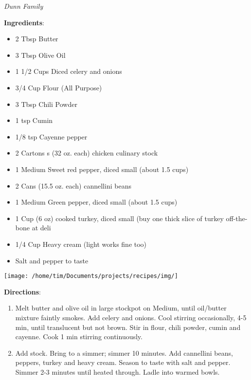 \documentclass[11pt, twoside, openany]{book}
\begin{document}
 \label{spicy-white-turkey-chili-soup}\hfill\textit{Dunn Family}\\
\begin{minipage}[t]{0.8\linewidth}
\textbf{Ingredients}:\vspace{-3mm}
\begin{multicols}{2}
\begin{itemize}\setlength\itemsep{-1mm}
\item 2 Tbsp Butter
\item 3 Tbsp Olive Oil
\item 1 1/2 Cups Diced celery and onions
\item 3/4 Cup Flour (All Purpose)
\item 3 Tbsp Chili Powder
\item 1 tsp Cumin
\item 1/8 tsp Cayenne pepper
\item 2 Cartons s (32 oz. each) chicken culinary stock
\item 1 Medium Sweet red pepper, diced small (about 1.5 cups)
\item 2 Cans (15.5 oz. each) cannellini beans
\item 1 Medium Green pepper, diced small (about 1.5 cups)
\item 1 Cup (6 oz) cooked turkey, diced small (buy one thick slice of turkey off-the-bone at deli
\item 1/4 Cup Heavy cream (light works fine too)
\item Salt and pepper to taste
\end{itemize}
\end{multicols}
\end{minipage}
\begin{minipage}[t]{0.2\linewidth}
\centering \strut\vspace*{-\baselineskip}\newline
\texttt{[image: /home/tim/Documents/projects/recipes/img/]}\\
\end{minipage}\vspace{3mm}
\textbf{Directions}:
\vspace{-3mm}\begin{enumerate}\setlength\itemsep{-1mm}
\item Melt butter and olive oil in large stockpot on Medium, until oil/butter mixture faintly smokes. Add celery and onions. Cool stirring occasionally, 4-5 min, until translucent but not brown. Stir in flour, chili powder, cumin and cayenne. Cook 1 min stirring continuously.
\item Add stock. Bring to a simmer; simmer 10 minutes. Add cannellini beans, peppers, turkey and heavy cream. Season to taste with salt and pepper. Simmer 2-3 minutes until heated through. Ladle into warmed bowls.
\end{enumerate}
\end{document}
